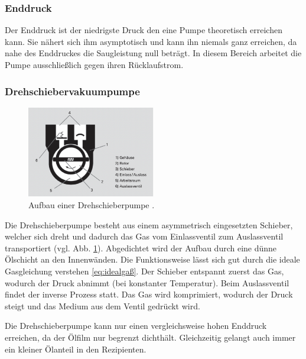 \subsubsection{Enddruck}
Der Enddruck ist der niedrigste Druck den eine Pumpe theoretisch erreichen kann.
Sie nähert sich ihm asymptotisch und kann ihn niemals ganz erreichen,
da nahe des Enddruckes die Saugleistung null beträgt.
In diesem Bereich arbeitet die Pumpe ausschließlich gegen ihren Rücklaufstrom.

\subsubsection{Drehschiebervakuumpumpe}
\begin{figure}[h]
    \centering
    \includegraphics[width=0.5\textwidth]{abb/drehpumpe.png}
    \caption{Aufbau einer Drehschieberpumpe \cite{Pfeifer}.} 
    \label{fig:drehpumpe}
\end{figure} 
Die Drehschieberpumpe besteht aus einem asymmetrisch eingesetzten Schieber, 
welcher sich dreht und dadurch das Gas vom Einlassventil zum Auslassventil transportiert (vgl. Abb. \ref{fig:drehpumpe}).
Abgedichtet wird der Aufbau durch eine dünne Ölschicht an den Innenwänden.
Die Funktionsweise lässt sich gut durch die ideale Gasgleichung verstehen \eqref{eq:idealgaß}.
Der Schieber entspannt zuerst das Gas, 
wodurch der Druck abnimmt (bei konstanter Temperatur).
Beim Auslassventil findet der inverse Prozess statt.
Das Gas wird komprimiert, wodurch der Druck steigt 
und das Medium aus dem Ventil gedrückt wird.

Die Drehschieberpumpe kann nur einen vergleichsweise hohen Enddruck erreichen,
da der Ölfilm nur begrenzt dichthält.
Gleichzeitig gelangt auch immer ein kleiner Ölanteil in den Rezipienten.
\newpage
